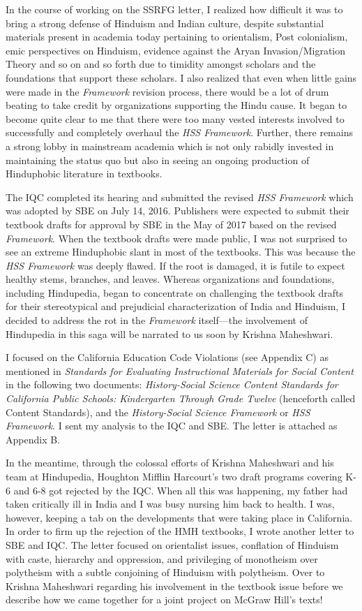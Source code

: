 In the course of working on the SSRFG letter, I realized how difficult it was to bring a strong defense of Hinduism and Indian culture, despite substantial materials present in academia today pertaining to orientalism, Post colonialism, emic perspectives on Hinduism, evidence against the Aryan Invasion/Migration Theory and so on and so forth due to timidity amongst scholars and the foundations that support these scholars. I also realized that even when little gains were made in the \textit{Framework} revision process, there would be a lot of drum beating to take credit by organizations supporting the Hindu cause. It began to become quite clear to me that there were too many vested interests involved to successfully and completely overhaul the \textit{HSS Framework}. Further, there remains a strong lobby in mainstream academia which is not only rabidly invested in maintaining the status quo but also in seeing an ongoing production of Hinduphobic literature in textbooks. 

The IQC completed its hearing and submitted the revised \textit{HSS Framework} which was adopted by SBE on July 14, 2016. Publishers were expected to submit their textbook drafts for approval by SBE in the May of 2017 based on the revised \textit{Framework}. When the textbook drafts were made public, I was not surprised to see an extreme Hinduphobic slant in most of the textbooks. This was because the \textit{HSS Framework} was deeply flawed. If the root is damaged, it is futile to expect healthy stems, branches, and leaves. Whereas organizations and foundations, including Hindupedia, began to concentrate on challenging the textbook drafts for their stereotypical and prejudicial characterization of India and Hinduism, I decided to address the rot in the \textit{Framework} itself—the involvement of Hindupedia in this saga will be narrated to us soon by Krishna Maheshwari. 

I focused on the California Education Code Violations (see Appendix C) as mentioned in \textit{Standards for Evaluating Instructional Materials for Social Content} in the following two documents: \textit{History-Social Science Content Standards for California Public Schools: Kindergarten Through Grade Twelve} (henceforth called Content Standards), and the \textit{History-Social Science Framework} or \textit{HSS Framework}. I sent my analysis to the IQC and SBE. The letter is attached as Appendix B. 

In the meantime, through the colossal efforts of Krishna Maheshwari and his team at Hindupedia, Houghton Mifflin Harcourt’s two draft programs covering K-6 and 6-8 got rejected by the IQC. When all this was happening, my father had taken critically ill in India and I was busy nursing him back to health. I was, however, keeping a tab on the developments that were taking place in California. In order to firm up the rejection of the HMH textbooks, I wrote another letter to SBE and IQC. The letter focused on orientalist issues, conflation of Hinduism with caste, hierarchy and oppression, and privileging of monotheism over polytheism with a subtle conjoining of Hinduism with polytheism. Over to Krishna Maheshwari regarding his involvement in the textbook issue before we describe how we came together for a joint project on McGraw Hill's texts! 


